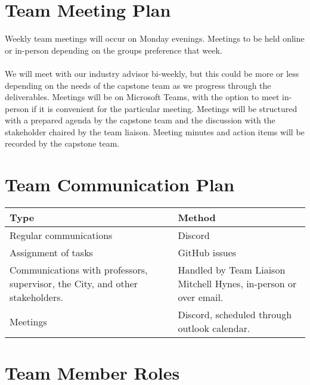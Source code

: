 \documentclass{article}
\begin{document}
\section{Team Meeting Plan}

Weekly team meetings will occur on Monday evenings. Meetings to be held online or in-person depending on
the groups preference that week.\\
\\
We will meet with our industry advisor bi-weekly, but this could be more or less depending on the needs of
the capstone team as we progress through the deliverables. Meetings will be on Microsoft Teams, with the
option to meet in-person if it is convenient for the particular meeting. Meetings will be structured with a
prepared agenda by the capstone team and the discussion with the stakeholder chaired by the team liaison.
Meeting minutes and action items will be recorded by the capstone team.


\section{Team Communication Plan}

\begin{longtable}{|m{5cm}|m{8cm}|}
  \hline
  \textbf{Type} & \textbf{Method}\\
  \hline
  Regular communications & Discord\\
  \hline
  Assignment of tasks & GitHub issues\\
  \hline
  Communications with professors, supervisor, the City, and other stakeholders. & Handled by Team Liaison Mitchell Hynes,
  in-person or over email.\\
  \hline
  Meetings & Discord, scheduled through outlook calendar.\\
  \hline
\end{longtable}

\section{Team Member Roles}
\end{document}
